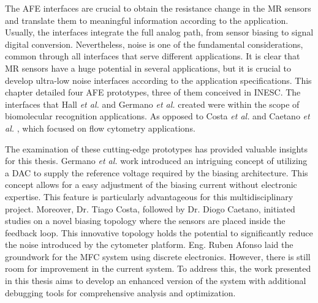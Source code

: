 The \ac{AFE} interfaces are crucial to obtain the resistance change in the \ac{MR} sensors and translate them to meaningful information according to the application. Usually, the interfaces integrate the full analog path, from sensor biasing to signal digital conversion. Nevertheless, noise is one of the fundamental considerations, common through all interfaces that serve different applications. It is clear that \ac{MR} sensors have a huge potential in several applications, but it is crucial to develop ultra-low noise interfaces according to the application specifications. This chapter detailed four \ac{AFE} prototypes, three of them conceived in \ac{INESC}. The interfaces that Hall \textit{et al.} \cite{PMID24761029} and Germano \textit{et al.} \cite{Germano2006MICROSYSTEMFB} created were within the scope of biomolecular recognition applications. As opposed to Costa \textit{et al.} \cite{TIM.2013.2296417} and Caetano \textit{et al.} \cite{Soares2019, DiogoC_thesis}, which focused on flow cytometry applications. 

The examination of these cutting-edge prototypes has provided valuable insights for this thesis. Germano \textit{et al.} work introduced an intriguing concept of utilizing a \ac{DAC} to supply the reference voltage required by the biasing architecture. This concept allows for a easy adjustment of the biasing current without electronic expertise. This feature is particularly advantageous for this multidisciplinary project. Moreover, Dr. Tiago Costa, followed by Dr. Diogo Caetano, initiated studies on a novel biasing topology where the sensors are placed inside the feedback loop. This innovative topology holds the potential to significantly reduce the noise introduced by the cytometer platform. Eng. Ruben Afonso laid the groundwork for the \ac{MFC} system using discrete electronics. However, there is still room for improvement in the current system. To address this, the work presented in this thesis aims to develop an enhanced version of the system with additional debugging tools for comprehensive analysis and optimization.

\clearpage
\thispagestyle{empty}
\cleardoublepage